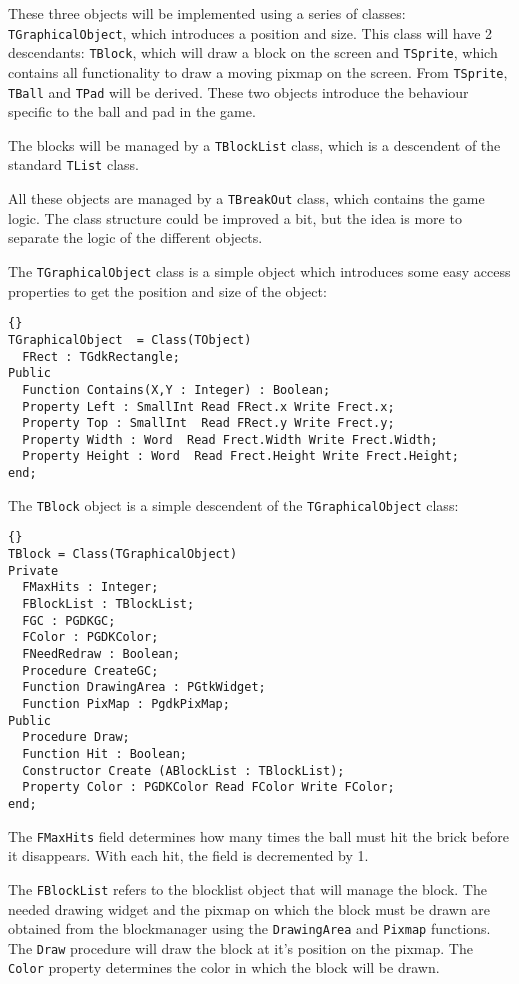 \documentclass[10pt]{article}
\newcommand{\var}[1]{\texttt{#1}}
\begin{document}
These three objects will be implemented using a series of classes:
\var{TGraphicalObject}, which introduces a position and size. This class
will have 2 descendants: \var{TBlock}, which will draw a block on the
screen and \var{TSprite}, which contains all functionality to draw a moving
pixmap on the screen. From \var{TSprite}, \var{TBall} and \var{TPad} will be
derived. These two objects introduce the behaviour specific to the ball and
pad in the game.

The blocks will be managed by a \var{TBlockList} class, which is a
descendent of the standard \var{TList} class. 

All these objects are managed by a \var{TBreakOut} class, which contains the
game logic. The class structure could be improved a bit, but the idea is
more to separate the logic of the different objects.

The \var{TGraphicalObject} class is a simple object which introduces some 
easy access properties to get the position and size of the object:
\begin{lstlisting}{}
TGraphicalObject  = Class(TObject)
  FRect : TGdkRectangle;
Public 
  Function Contains(X,Y : Integer) : Boolean;
  Property Left : SmallInt Read FRect.x Write Frect.x;
  Property Top : SmallInt  Read FRect.y Write Frect.y;
  Property Width : Word  Read Frect.Width Write Frect.Width;
  Property Height : Word  Read Frect.Height Write Frect.Height;
end;
\end{lstlisting}{}

The \var{TBlock} object is a simple descendent of the \var{TGraphicalObject}
class:
\begin{lstlisting}{}
TBlock = Class(TGraphicalObject)
Private
  FMaxHits : Integer;
  FBlockList : TBlockList;
  FGC : PGDKGC;
  FColor : PGDKColor;
  FNeedRedraw : Boolean;
  Procedure CreateGC;
  Function DrawingArea : PGtkWidget;
  Function PixMap : PgdkPixMap; 
Public
  Procedure Draw;
  Function Hit : Boolean;
  Constructor Create (ABlockList : TBlockList);
  Property Color : PGDKColor Read FColor Write FColor;
end;
\end{lstlisting}{}
The \var{FMaxHits} field determines how many times the ball must hit the
brick before it disappears. With each hit, the field is decremented by 1.

The \var{FBlockList} refers to the blocklist object that will manage the 
block. The needed drawing widget and the pixmap on which the block must be
drawn are obtained from the blockmanager using the \var{DrawingArea} and 
\var{Pixmap} functions.
The \var{Draw} procedure will draw the block at it's position on the pixmap.
The \var{Color} property determines the color in which the block will be
drawn.
\end{document}
